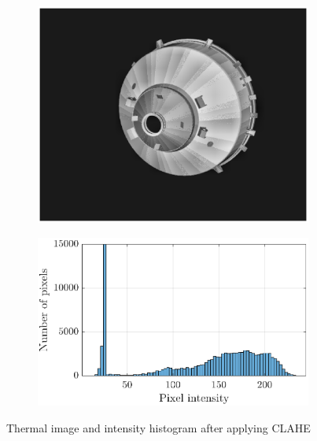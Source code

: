 \begin{figure}[!h]
\captionsetup[subfigure]{labelformat=empty}
\begin{subfigure}[a]{0.42\linewidth}
\centering
    \includegraphics[width=\linewidth]{Images/imgCLAHEafter.eps}
\end{subfigure}\hfill
\begin{subfigure}[a]{0.55\linewidth}
\centering
    \includegraphics[width=\linewidth]{Images/CLAHEafter.eps}
\end{subfigure}
    \caption{Thermal image and intensity histogram after applying CLAHE}
    \label{fig:CLAHEafter}
\end{figure}

